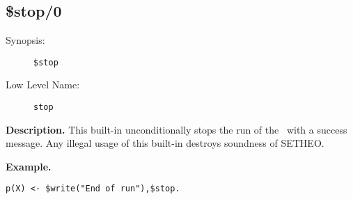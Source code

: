 %
%
%
\subsection{\$stop/0}

\begin{description}
\item[Synopsis:]
	{\tt \$stop}
\item[Low Level Name:]
	{\tt stop}
\end{description}

\vspace*{0.5cm}
\noindent
{\bf Description.}
This built-in unconditionally stops the run of the \SAM\ with a success
message. Any illegal usage of this built-in destroys soundness of
SETHEO.

\vspace*{0.5cm}
\noindent
{\bf Example.}
\begin{verbatim}
p(X) <- $write("End of run"),$stop.
\end{verbatim}


